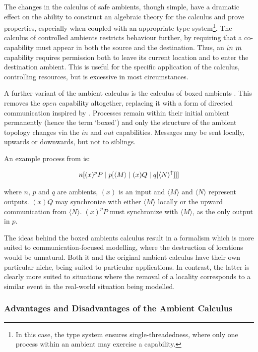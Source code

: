The changes in the calculus of safe ambients, though simple, have a
dramatic effect on the ability to construct an algebraic theory for the
calculus and prove properties, especially when coupled with an
appropriate type system\footnote{In this case, the type system ensures
single-threadedness, where only one process within an ambient may
exercise a capability.}.  The calculus of controlled ambients
\cite{controlledamb02} restricts behaviour further, by requiring that a
co-capability must appear in both the source and the destination.  Thus,
an $in\ m$ capability requires permission both to leave its current
location and to enter the destination ambient. This is useful for the
specific application of the calculus, controlling resources, but is
excessive in most circumstances.

A further variant of the ambient calculus is the calculus of boxed
ambients \cite{boxedamb01}.  This removes the $open$ capability
altogether, replacing it with a form of directed communication inspired
by \cite{seal}.  Processes remain within their initial ambient
permanently (hence the term `boxed') and only the structure of the
ambient topology changes via the $in$ and $out$ capabilities.  Messages
may be sent locally, upwards or downwards, but not to siblings.

An example process from \cite{boxedamb01} is:

\begin{equation}
n[(x)^pP \;|\; p[\langle M \rangle \;|\; (x)Q \;|\; q[\langle N
\rangle^\uparrow ]]]
\end{equation}

\noindent where $n$, $p$ and $q$ are ambients, $(x)$ is an input and
$\langle M \rangle$ and $\langle N \rangle$ represent outputs.  $(x)Q$
may synchronize with either $\langle M \rangle$ locally or the upward
communication from $\langle N \rangle$.  $(x)^pP$ must synchronize with
$\langle M \rangle$, as the only output in $p$.

The ideas behind the boxed ambients calculus result in a formalism which
is more suited to communication-focused modelling, where the destruction
of locations would be unnatural.  Both it and the original ambient
calculus have their own particular niche, being suited to particular
applications.  In contrast, the latter is clearly more suited to
situations where the removal of a locality corresponds to a similar
event in the real-world situation being modelled.

\subsubsection{Advantages and Disadvantages of the Ambient Calculus}

